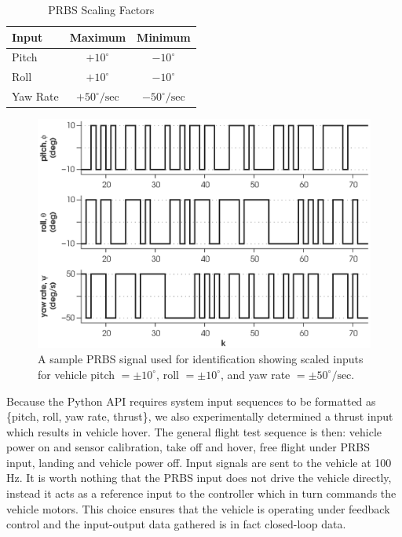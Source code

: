 \begin{table}[!htb]
\centering
\caption{PRBS Scaling Factors}\vspace{1em}
\begin{tabular}{lcc}
\toprule
Input & Maximum & Minimum\\
\midrule
Pitch & $+10^\circ$ & $-10^\circ$\\
Roll & $+10^\circ$ & $-10^\circ$\\
Yaw Rate & $+50^\circ/\mbox{sec}$ & $-50^\circ/\mbox{sec}$\\
\bottomrule
\end{tabular}
\end{table}

\begin{figure}[htb!]
	\centering
	\includegraphics{../fig/test_prbs.eps}
	\caption[A sample PRBS signal used for identification showing scaled inputs for vehicle pitch, roll, and yaw rate.]{A sample PRBS signal used for identification showing scaled inputs for vehicle pitch $= \pm 10^\circ$, roll $= \pm 10^\circ$, and yaw rate $= \pm 50^\circ/\mbox{sec}$.}
\end{figure}

Because the Python API requires system input sequences to be formatted as \{pitch, roll, yaw rate, thrust\}, we also experimentally determined a thrust input which results in vehicle hover. The general flight test sequence is then: vehicle power on and sensor calibration, take off and hover, free flight under PRBS input, landing and vehicle power off. Input signals are sent to the vehicle at 100 Hz. It is worth nothing that the PRBS input does not drive the vehicle directly, instead it acts as a reference input to the controller which in turn commands the vehicle motors. This choice ensures that the vehicle is operating under feedback control and the input-output data gathered is in fact closed-loop data.

